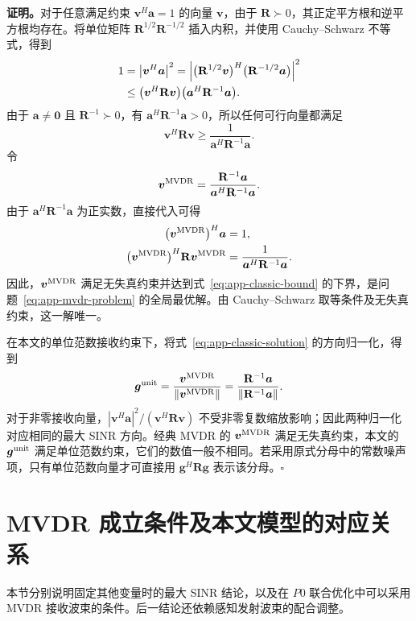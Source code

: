 \documentclass[11pt,a4paper]{ctexart}
\begin{document}
\noindent\textbf{证明。}对于任意满足约束 $\bm v^H\bm a=1$ 的向量 $\bm v$，由于 $\mathbf R\succ0$，其正定平方根和逆平方根均存在。将单位矩阵 $\mathbf R^{1/2}\mathbf R^{-1/2}$ 插入内积，并使用 Cauchy--Schwarz 不等式，得到
\begin{align}\label{eq:app-classic-cs}
1&=\left|\bm v^H\bm a\right|^2
=\left|\bigl(\mathbf R^{1/2}\bm v\bigr)^H
\bigl(\mathbf R^{-1/2}\bm a\bigr)\right|^2\notag\\
&\le\bigl(\bm v^H\mathbf R\bm v\bigr)
\bigl(\bm a^H\mathbf R^{-1}\bm a\bigr).
\end{align}
由于 $\bm a\ne\bm0$ 且 $\mathbf R^{-1}\succ0$，有 $\bm a^H\mathbf R^{-1}\bm a>0$，所以任何可行向量都满足
\begin{equation}\label{eq:app-classic-bound}
\bm v^H\mathbf R\bm v\ge
\frac{1}{\bm a^H\mathbf R^{-1}\bm a}.
\end{equation}
令
\begin{equation}\label{eq:app-classic-solution}
\bm v^{\rm MVDR}=
\frac{\mathbf R^{-1}\bm a}{\bm a^H\mathbf R^{-1}\bm a}.
\end{equation}
由于 $\bm a^H\mathbf R^{-1}\bm a$ 为正实数，直接代入可得
\begin{align}\label{eq:app-classic-check}
\bigl(\bm v^{\rm MVDR}\bigr)^H\bm a&=1,\\
\bigl(\bm v^{\rm MVDR}\bigr)^H\mathbf R\bm v^{\rm MVDR}
&=\frac{1}{\bm a^H\mathbf R^{-1}\bm a}.\notag
\end{align}
因此，$\bm v^{\rm MVDR}$ 满足无失真约束并达到式~\eqref{eq:app-classic-bound} 的下界，是问题~\eqref{eq:app-mvdr-problem} 的全局最优解。由 Cauchy--Schwarz 取等条件及无失真约束，这一解唯一。

在本文的单位范数接收约束下，将式~\eqref{eq:app-classic-solution} 的方向归一化，得到
\begin{equation}\label{eq:app-unit-norm}
\bm g^{\rm unit}=\frac{\bm v^{\rm MVDR}}{\|\bm v^{\rm MVDR}\|}
=\frac{\mathbf R^{-1}\bm a}{\|\mathbf R^{-1}\bm a\|}.
\end{equation}
对于非零接收向量，$|\bm v^H\bm a|^2/(\bm v^H\mathbf R\bm v)$ 不受非零复数缩放影响；因此两种归一化对应相同的最大 SINR 方向。经典 MVDR 的 $\bm v^{\rm MVDR}$ 满足无失真约束，本文的 $\bm g^{\rm unit}$ 满足单位范数约束，它们的数值一般不相同。若采用原式分母中的常数噪声项，只有单位范数向量才可直接用 $\bm g^H\mathbf R\bm g$ 表示该分母。\hfill$\square$

\clearpage
\section{MVDR 成立条件及本文模型的对应关系}\label{app:conditions}
本节分别说明固定其他变量时的最大 SINR 结论，以及在 $P0$ 联合优化中可以采用 MVDR 接收波束的条件。后一结论还依赖感知发射波束的配合调整。
\end{document}
